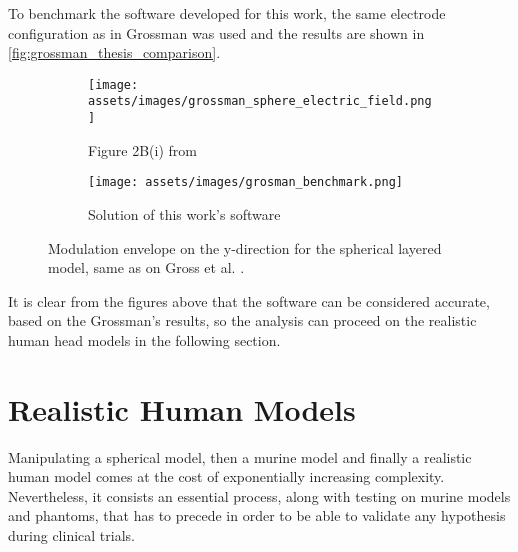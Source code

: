 To benchmark the software developed for this work, the same electrode configuration as in Grossman \cite{Grossman2017} was used and the results are shown in \autoref{fig:grossman_thesis_comparison}.
\begin{figure}[H]
    \centering
    \begin{subfigure}[b]{0.49\textwidth}
        \centering
        \texttt{[image: assets/images/grossman\_sphere\_electric\_field.png]}
        \caption{Figure 2B(i) from }
        \label{fig:grossman_envelope}
    \end{subfigure}
    \begin{subfigure}[b]{0.49\textwidth}
        \centering
        \texttt{[image: assets/images/grosman\_benchmark.png]}
        \caption{Solution of this work's software}
        \label{fig:envelope_at_y_benchmark}
    \end{subfigure}
    \caption[Modulation envelope on the y-direction for the spherical layered model]{Modulation envelope on the y-direction for the spherical layered model, same as on Gross et al. \cite[Figure 2B]{Grossman2017}.}
    \label{fig:grossman_thesis_comparison}
\end{figure}

It is clear from the figures above that the software can be considered accurate, based on the Grossman's results, so the analysis can proceed on the realistic human head models in the following section.

\section{Realistic Human Models}
\label{sec:realistic_human_models}

Manipulating a spherical model, then a murine model and finally a realistic human model comes at the cost of exponentially increasing complexity. Nevertheless, it consists an essential process, along with testing on murine models and phantoms, that has to precede in order to be able to validate any hypothesis during clinical trials.

